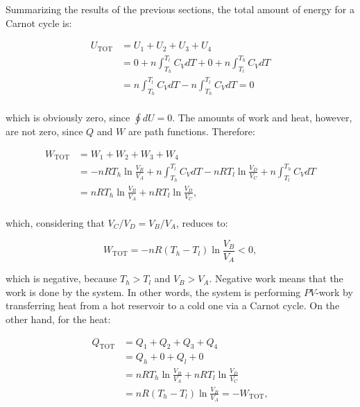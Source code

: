 \documentclass[
  9pt,
]{extbook}
\theoremstyle{definition}
\theoremstyle{definition}
\theoremstyle{definition}
\theoremstyle{remark}
\begin{document}
Summarizing the results of the previous sections, the total amount of energy for a Carnot cycle is:

\begin{equation}
\begin{aligned}
  U_{\text{TOT}} & = U_1+U_2+U_3+U_4 \\
                 & = 0 + n \int_{T_h}^{T_l} C_V dT + 0 + n \int_{T_l}^{T_h} C_V dT  \\
                 & = n \int_{T_h}^{T_l} C_V dT - n \int_{T_h}^{T_l} C_V dT = 0 \\
\end{aligned}
  \label{eq:UtotCC}
\end{equation}

which is obviously zero, since \(\oint dU=0\). The amounts of work and heat, however, are not zero, since \(Q\) and \(W\) are path functions. Therefore:

\begin{equation}
\begin{aligned}
  W_{\text{TOT}} & = W_1+W_2+W_3+W_4 \\
                 & = - nRT_h \ln \frac{V_B}{V_A} + n \int_{T_h}^{T_l} C_V dT - nRT_l \ln \frac{V_D}{V_C} + n \int_{T_l}^{T_h} C_V dT \\
                 & = nRT_h \ln \frac{V_B}{V_A} + nRT_l \ln \frac{V_D}{V_C}, \\
\end{aligned}
  \label{eq:WtotCC}
\end{equation}

which, considering that \(V_C/V_D=V_B/V_A\), reduces to:

\begin{equation}
  W_{\text{TOT}} = - nR \left( T_h-T_l \right) \ln \frac{V_B}{V_A} < 0,
  \label{eq:WtotCC2}
\end{equation}

which is negative, because \(T_h>T_l\) and \(V_B>V_A\). Negative work means that the work is done by the system. In other words, the system is performing \(PV\)-work by transferring heat from a hot reservoir to a cold one via a Carnot cycle. On the other hand, for the heat:

\begin{equation}
\begin{aligned}
  Q_{\text{TOT}} & = Q_1+Q_2+Q_3+Q_4 \\
                 & = Q_h + 0 + Q_l + 0    \\
                 & = nRT_h \ln \frac{V_B}{V_A} + nRT_l \ln \frac{V_D}{V_C} \\
                 & = nR \left( T_h-T_l \right) \ln \frac{V_B}{V_A} = -W_{\text{TOT}},
\end{aligned}
  \label{eq:QtotCC}
\end{equation}
\end{document}
